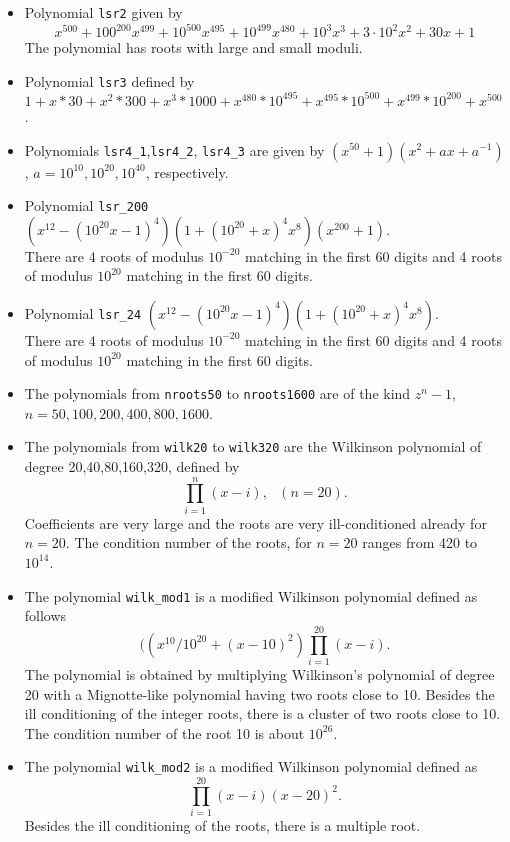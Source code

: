 \documentclass{article}
\begin{document}
\begin{itemize}
\item Polynomial {\tt lsr2} given by
\[
 x^{500} +100^{200} x^{499}+ 10^{500} x^{495}+ 10^{499} x^{480}+10^3
 x^3+3\cdot 10^2 x^2+30 x+1
\]
The polynomial has roots with large and small moduli.

\item Polynomial {\tt lsr3} defined by
$1+x*30+x^2*300+x^3*1000+x^{480}*10^{495}
+x^{495}* 10^{500}
+x^{499}*10^{200}
+x^{500}$.


\item Polynomials {\tt lsr4\_1},{\tt lsr4\_2}, {\tt lsr4\_3} are given by  
$(x^{50}+1)(x^2+ax+a^{-1})$, $a=10^{10}, 10^{20}, 10^{40}$, respectively.


\item Polynomial {\tt lsr\_200}
$(x^{12}-(10^{20} x-1)^4)(1+(10^{20}+x)^4 x^8)(x^{200}+1)$. \\
 There are 4 roots of modulus $10^{-20}$ matching in the
  first 60 digits and 4 roots of modulus $10^{20}$ matching in the
  first 60 digits.


\item Polynomial {\tt lsr\_24}
 $(x^{12}-(10^{20} x-1)^4)(1+(10^{20}+x)^4 x^8)$.\\
  There are 4 roots of modulus $10^{-20}$ matching in the
 first 60 digits and 4 roots of modulus $10^{20}$ matching in the
 first 60 digits.

\item The polynomials from {\tt nroots50} to {\tt nroots1600} are of
the kind $z^n-1$, $n=50,100,200,400,800,1600$.

\item The polynomials from  {\tt wilk20} to {\tt wilk320} are the
  Wilkinson polynomial of degree 20,40,80,160,320, defined by
\[
   \prod_{i=1}^n(x-i), \ \ \ (n=20).
\]
Coefficients are very large and the roots are very ill-conditioned
already for $n=20$.  The condition number of the roots, for $n=20$
ranges from 420 to $10^{14}$.

\item The polynomial {\tt wilk\_mod1} is a modified Wilkinson 
polynomial defined as follows
\[
   ((x^{10}/10^{20}+(x-10)^2) \prod_{i=1}^{20}(x-i).
\]
The polynomial is obtained by multiplying Wilkinson's polynomial of
degree 20 with a Mignotte-like polynomial having two roots close to
10.  Besides the ill conditioning of the integer roots, there is a
cluster of two roots close to 10. The condition number of the root 10
is about $10^{26}$.

\item The polynomial {\tt wilk\_mod2} is a modified Wilkinson polynomial
defined as
\[
   \prod_{i=1}^{20}(x-i)(x-20)^2.
\]
Besides the ill conditioning of the roots, there is a multiple root.



\end{itemize}
\end{document}
